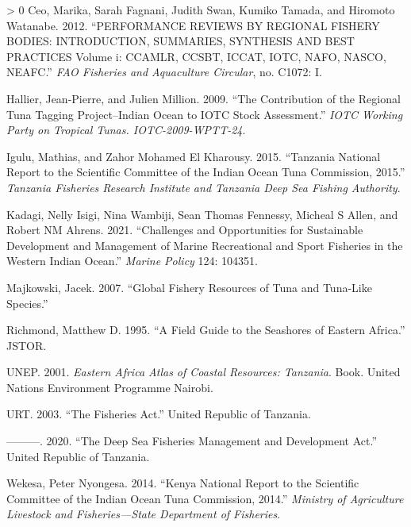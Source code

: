 \documentclass[
  12pt,
  a4paper,
  oneside]{book}
\newlength{\li}\setlength{\li}{14.48pt}
\newlength{\di}\setlength{\di}{-3.5mm}
\newlength{\cslhangindent}
\newenvironment{CSLReferences}[3] %
 {%
  \setlength{\parindent}{0pt}
  \ifodd #1 \everypar{\setlength{\hangindent}{\cslhangindent}}\ignorespaces\fi
  \ifnum #2 > 0
  \setlength{\parskip}{#2\baselineskip}
  \fi
 }%
 {}
\begin{document}
\hypertarget{refs}{}
\begin{CSLReferences}{1}{0}
\leavevmode\hypertarget{ref-ceo2012performance}{}%
Ceo, Marika, Sarah Fagnani, Judith Swan, Kumiko Tamada, and Hiromoto Watanabe. 2012. {``PERFORMANCE REVIEWS BY REGIONAL FISHERY BODIES: INTRODUCTION, SUMMARIES, SYNTHESIS AND BEST PRACTICES Volume i: CCAMLR, CCSBT, ICCAT, IOTC, NAFO, NASCO, NEAFC.''} \emph{FAO Fisheries and Aquaculture Circular}, no. C1072: I.

\leavevmode\hypertarget{ref-hallier}{}%
Hallier, Jean-Pierre, and Julien Million. 2009. {``The Contribution of the Regional Tuna Tagging Project--Indian Ocean to IOTC Stock Assessment.''} \emph{IOTC Working Party on Tropical Tunas. IOTC-2009-WPTT-24}.

\leavevmode\hypertarget{ref-igulu}{}%
Igulu, Mathias, and Zahor Mohamed El Kharousy. 2015. {``Tanzania National Report to the Scientific Committee of the Indian Ocean Tuna Commission, 2015.''} \emph{Tanzania Fisheries Research Institute and Tanzania Deep Sea Fishing Authority}.

\leavevmode\hypertarget{ref-kadagi2021challenges}{}%
Kadagi, Nelly Isigi, Nina Wambiji, Sean Thomas Fennessy, Micheal S Allen, and Robert NM Ahrens. 2021. {``Challenges and Opportunities for Sustainable Development and Management of Marine Recreational and Sport Fisheries in the Western Indian Ocean.''} \emph{Marine Policy} 124: 104351.

\leavevmode\hypertarget{ref-majkowski}{}%
Majkowski, Jacek. 2007. {``Global Fishery Resources of Tuna and Tuna-Like Species.''}

\leavevmode\hypertarget{ref-richmond1995field}{}%
Richmond, Matthew D. 1995. {``A Field Guide to the Seashores of Eastern Africa.''} JSTOR.

\leavevmode\hypertarget{ref-easternResources}{}%
UNEP. 2001. \emph{Eastern Africa Atlas of Coastal Resources: Tanzania}. Book. United Nations Environment Programme Nairobi.

\leavevmode\hypertarget{ref-tfa}{}%
URT. 2003. {``The Fisheries Act.''} United Republic of Tanzania.

\leavevmode\hypertarget{ref-dsfa}{}%
---------. 2020. {``The Deep Sea Fisheries Management and Development Act.''} United Republic of Tanzania.

\leavevmode\hypertarget{ref-wekesa}{}%
Wekesa, Peter Nyongesa. 2014. {``Kenya National Report to the Scientific Committee of the Indian Ocean Tuna Commission, 2014.''} \emph{Ministry of Agriculture Livestock and Fisheries---State Department of Fisheries}.

\end{CSLReferences}
\end{document}
